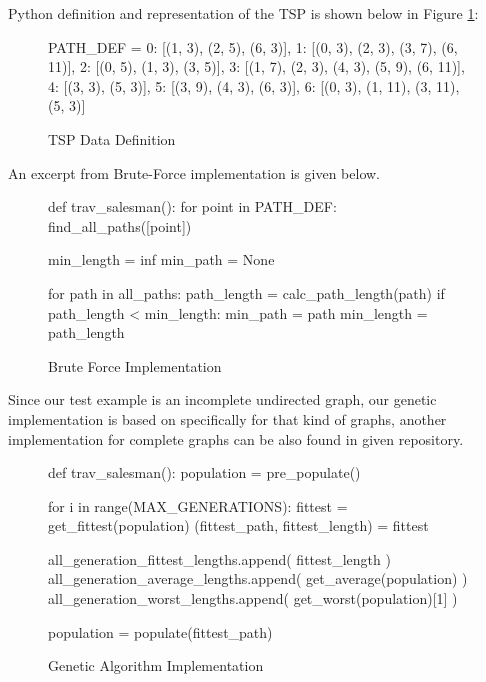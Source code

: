 \documentclass[journal,transmag]{IEEEtran}
\begin{document}
    Python definition and representation of the TSP is shown below in Figure
    \ref{fig:data-definition}:

    \begin{figure}[h!]
        \begin{python}
PATH_DEF = {
    0: [(1, 3), (2, 5), (6, 3)],
    1: [(0, 3), (2, 3), (3, 7), (6, 11)],
    2: [(0, 5), (1, 3), (3, 5)],
    3: [(1, 7), (2, 3), (4, 3), (5, 9), (6, 11)],
    4: [(3, 3), (5, 3)],
    5: [(3, 9), (4, 3), (6, 3)],
    6: [(0, 3), (1, 11), (3, 11), (5, 3)]
}
        \end{python}
        \caption{TSP Data Definition}
        \label{fig:data-definition}
    \end{figure}

    An excerpt from Brute-Force implementation is given below.
    \begin{figure}[h!]
        \begin{python}
def trav_salesman():
    for point in PATH_DEF:
        find_all_paths([point])

    min_length = inf
    min_path = None

    for path in all_paths:
        path_length = calc_path_length(path)
        if path_length < min_length:
            min_path = path
            min_length = path_length
        \end{python}
        \caption{Brute Force Implementation}
    \end{figure}

    Since our test example is an incomplete undirected graph, our genetic implementation
    is based on specifically for that kind of graphs, another implementation for
    complete graphs can be also found in given repository. \cite{code_repository}

    \begin{figure}[h!]
        \begin{python}
def trav_salesman():
    population = pre_populate()

    for i in range(MAX_GENERATIONS):
        fittest = get_fittest(population)
        (fittest_path, fittest_length) = fittest

        all_generation_fittest_lengths.append(
            fittest_length
        )
        all_generation_average_lengths.append(
            get_average(population)
        )
        all_generation_worst_lengths.append(
            get_worst(population)[1]
        )

        population = populate(fittest_path)
        \end{python}
        \caption{Genetic Algorithm Implementation}
    \end{figure}
\end{document}

